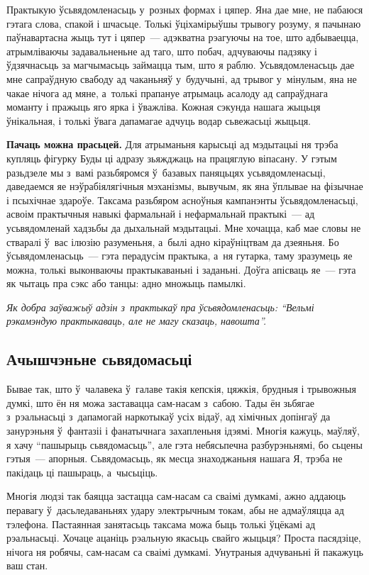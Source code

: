 Практыкую ўсьвядомленасьць у~розных формах і цяпер. Яна дае мне, не пабаюся гэтага слова, спакой і шчасьце. Толькі ўціхамірыўшы трывогу розуму, я пачынаю паўнавартасна жыць тут і цяпер~--- адэкватна рэагуючы на тое, што адбываецца, атрымліваючы задавальненьне ад таго, што побач, адчуваючы падзяку і ўдзячнасьць за магчымасьць займацца тым, што я раблю. Усьвядомленасьць дае мне сапраўдную свабоду ад чаканьняў у~будучыні, ад трывог у~мінулым, яна не чакае нічога ад мяне, а~толькі прапануе атрымаць асалоду ад сапраўднага моманту і пражыць яго ярка і ўважліва. Кожная сэкунда нашага жыцьця ўнікальная, і толькі ўвага дапамагае адчуць водар сьвежасьці жыцьця.

\textbf{Пачаць можна прасьцей.} Для атрыманьня карысьці ад мэдытацыі ня трэба купляць фігурку Буды ці адразу зьяжджаць на працяглую віпасану. У гэтым разьдзеле мы з~вамі разьбяромся ў~базавых паняцьцях усьвядомленасьці, даведаемся яе нэўрабіялягічныя мэханізмы, вывучым, як яна ўплывае на фізычнае і псыхічнае здароўе. Таксама разьбяром асноўныя кампанэнты ўсьвядомленасьці, асвоім практычныя навыкі фармальнай і нефармальнай практыкі~--- ад усьвядомленай хадзьбы да дыхальнай мэдытацыі. Мне хочацца, каб мае словы не стваралі ў~вас ілюзію разуменьня, а~былі адно кіраўніцтвам да дзеяньня. Бо ўсьвядомленасьць~--- гэта перадусім практыка, а~ня гутарка, таму зразумець яе можна, толькі выконваючы практыкаваньні і заданьні. Доўга апісваць яе~--- гэта як чытаць пра сэкс або танцы: адно множыць памылкі. 

\emph{Як добра заўважыў адзін з~практыкаў пра ўсьвядомленасьць: ``Вельмі рэкамэндую практыкаваць, але не магу сказаць, навошта''.}

\subsection*{Ачышчэньне сьвядомасьці}

Бывае так, што ў~чалавека ў~галаве такія кепскія, цяжкія, брудныя і трывожныя думкі, што ён ня можа заставацца сам-насам з~сабою. Тады ён зьбягае з~рэальнасьці з~дапамогай наркотыкаў усіх відаў, ад хімічных допінгаў да занурэньня ў~фантазіі і фанатычнага захапленьня ідэямі. Многія кажуць, маўляў, я хачу ``пашырыць сьвядомасьць'', але гэта небясьпечна разбурэньнямі, бо сьцены гэтыя~--- апорныя. Сьвядомасьць, як месца знаходжаньня нашага Я, трэба не пакідаць ці пашыраць, а~чысьціць.

Многія людзі так баяцца застацца сам-насам са сваімі думкамі, ажно аддаюць перавагу ў~дасьледаваньнях удару электрычным токам, абы не адмаўляцца ад тэлефона. Пастаянная занятасьць таксама можа быць толькі ўцёкамі ад рэальнасьці. Хочаце ацаніць рэальную якасьць свайго жыцьця? Проста пасядзіце, нічога ня робячы, сам-насам са сваімі думкамі. Унутраныя адчуваньні й пакажуць ваш стан.

